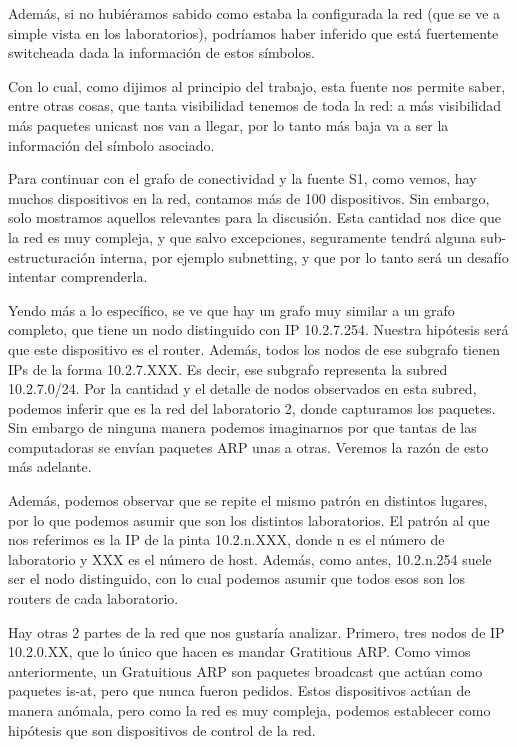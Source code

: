 Además, si no hubi\'eramos sabido como estaba la configurada la red (que se ve a simple vista en los laboratorios), podríamos haber inferido que está fuertemente switcheada dada la información de estos símbolos.

Con lo cual, como dijimos al principio del trabajo, esta fuente nos permite saber, entre otras cosas, que tanta visibilidad tenemos de toda la red: a más visibilidad más paquetes unicast nos van a llegar, por lo tanto más baja va a ser la información del símbolo asociado.



Para continuar con el grafo de conectividad y la fuente S1, como vemos, hay muchos dispositivos en la red, contamos más de 100 dispositivos. Sin embargo, solo mostramos aquellos relevantes para la discusión. Esta cantidad nos dice que la red es muy compleja, y que salvo excepciones, seguramente tendrá alguna sub-estructuración interna, por ejemplo subnetting, y que por lo tanto será un desafío intentar comprenderla.


Yendo más a lo específico, se ve que hay un grafo muy similar a un grafo completo, que tiene un nodo distinguido con IP 10.2.7.254. Nuestra hipótesis será que este dispositivo es el router.
Además, todos los nodos de ese subgrafo tienen IPs de la forma 10.2.7.XXX.
Es decir, ese subgrafo representa la subred 10.2.7.0/24.
Por la cantidad y el detalle de nodos observados en esta subred, podemos inferir que es la red del laboratorio 2, donde capturamos los paquetes.
Sin embargo de ninguna manera podemos imaginarnos por que tantas de las computadoras se envían paquetes ARP unas a otras. Veremos la razón de esto más adelante.

Además, podemos observar que se repite el mismo patrón en distintos lugares, por lo que podemos asumir que son los distintos laboratorios. El patrón al que nos referimos es la IP de la pinta 10.2.n.XXX, donde n es el número de laboratorio y XXX es el número de host. Además, como antes, 10.2.n.254 suele ser el nodo distinguido, con lo cual podemos asumir que todos esos son los routers de cada laboratorio.

Hay otras 2 partes de la red que nos gustaría analizar. Primero, tres nodos de IP 10.2.0.XX, que lo único que hacen es mandar Gratitious ARP. Como vimos anteriormente, un Gratuitious ARP son paquetes broadcast que actúan como paquetes is-at, pero que nunca fueron pedidos.
Estos dispositivos actúan de manera anómala, pero como la red es muy compleja, podemos establecer como hipótesis que son dispositivos de control de la red.

